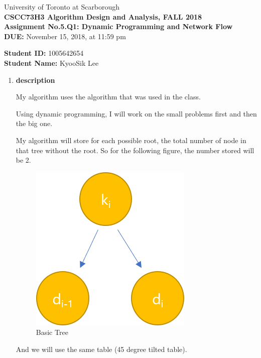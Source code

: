\documentclass[a4paper,11pt]{article}
\begin{document}
\begin{center}
University of Toronto at Scarborough\\[0.1in]
{\bf CSCC73H3 Algorithm Design and Analysis, FALL 2018} \\[0.1in]
{\large{\bf Assignment No.5.Q1: Dynamic Programming and Network Flow}}\\[0.1in]
{\bf DUE:} November 15, 2018, at 11:59 pm
\end{center}


\vspace{0.1in}
\noindent
{\bf Student ID:} 1005642654 \\[0.15in]
{\bf Student Name:} KyooSik Lee
\vspace{0.3in}

\vspace{0.3in}
\begin{enumerate}

\item {\bf description}

My algorithm uses the algorithm that was used in the class. 

Using dynamic programming, I will work on the small problems first and then the big one.

My algorithm will store for each possible root, the total number of node in that tree without the root. So for the following figure, the number stored will be 2.

\begin{figure}[hbt]
	\centering
	\includegraphics[scale=0.4]{figure1.png}
	\caption{Basic Tree}
\end{figure}

And we will use the same table (45 degree tilted table).


\end{enumerate}
\end{document}
